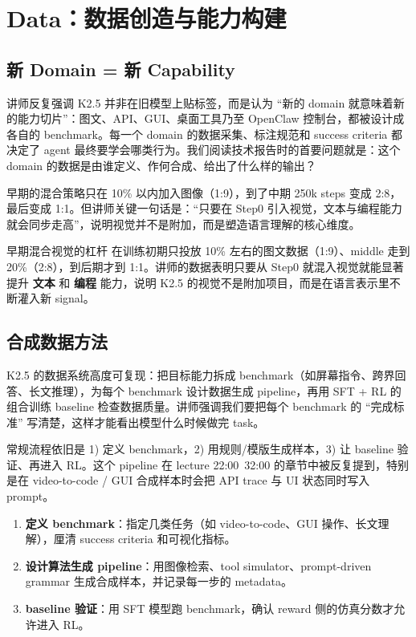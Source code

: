 \section{Data：数据创造与能力构建}

\subsection{新 Domain = 新 Capability}
讲师反复强调 K2.5 并非在旧模型上贴标签，而是认为 ``新的 domain 就意味着新的能力切片''：图文、API、GUI、桌面工具乃至 OpenClaw 控制台，都被设计成各自的 benchmark。每一个 domain 的数据采集、标注规范和 success criteria 都决定了 agent 最终要学会哪类行为。我们阅读技术报告时的首要问题就是：这个 domain 的数据是由谁定义、作何合成、给出了什么样的输出？

早期的混合策略只在 10\% 以内加入图像（1:9），到了中期 250k steps 变成 2:8，最后变成 1:1。但讲师关键一句话是：``只要在 Step0 引入视觉，文本与编程能力就会同步走高''，说明视觉并不是附加，而是塑造语言理解的核心维度。

\begin{importantbox}{早期混合视觉的杠杆}
在训练初期只投放 10\% 左右的图文数据（1:9）、middle 走到 20\%（2:8），到后期才到 1:1。讲师的数据表明只要从 Step0 就混入视觉就能显著提升 \textbf{文本} 和 \textbf{编程} 能力，说明 K2.5 的视觉不是附加项目，而是在语言表示里不断灌入新 signal。
\end{importantbox}

\subsection{合成数据方法}
K2.5 的数据系统高度可复现：把目标能力拆成 benchmark（如屏幕指令、跨界回答、长文推理），为每个 benchmark 设计数据生成 pipeline，再用 SFT + RL 的组合训练 baseline 检查数据质量。讲师强调我们要把每个 benchmark 的 ``完成标准'' 写清楚，这样才能看出模型什么时候做完 task。

常规流程依旧是 1) 定义 benchmark，2) 用规则/模版生成样本，3) 让 baseline 验证、再进入 RL。这个 pipeline 在 lecture 22:00~32:00 的章节中被反复提到，特别是在 video-to-code / GUI 合成样本时会把 API trace 与 UI 状态同时写入 prompt。

\begin{enumerate}
    \item \textbf{定义 benchmark}：指定几类任务（如 video-to-code、GUI 操作、长文理解），厘清 success criteria 和可视化指标。
    \item \textbf{设计算法生成 pipeline}：用图像检索、tool simulator、prompt-driven grammar 生成合成样本，并记录每一步的 metadata。
    \item \textbf{baseline 验证}：用 SFT 模型跑 benchmark，确认 reward 侧的仿真分数才允许进入 RL。
\end{enumerate}

